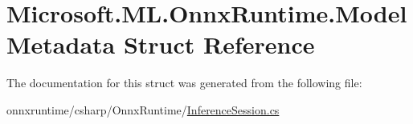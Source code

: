 \hypertarget{structMicrosoft_1_1ML_1_1OnnxRuntime_1_1ModelMetadata}{}\section{Microsoft.\+M\+L.\+Onnx\+Runtime.\+Model\+Metadata Struct Reference}
\label{structMicrosoft_1_1ML_1_1OnnxRuntime_1_1ModelMetadata}


The documentation for this struct was generated from the following file\+:\begin{DoxyCompactItemize}
\item 
onnxruntime/csharp/\+Onnx\+Runtime/\mbox{\hyperlink{InferenceSession_8cs}{Inference\+Session.\+cs}}\end{DoxyCompactItemize}
